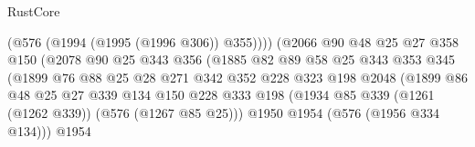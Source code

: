 \begin{lexlean}{RustCore}
\begin{coremodule}
                                        (@576 (@1994 (@1995 (@1996 @306)) @355))))
                                    (@2066
                                      @90
                                      @48
                                      @25
                                      @27
                                      @358
                                      @150
                                      (@2078
                                        @90
                                        @25
                                        @343
                                        @356
                                        (@1885
                                          @82
                                          @89
                                          @58
                                          @25
                                          @343
                                          @353
                                          @345
                                          (@1899
                                            @76
                                            @88
                                            @25
                                            @28
                                            @271
                                            @342
                                            @352
                                            @228
                                            @323
                                            @198
                                            @2048
                                            (@1899
                                              @86
                                              @48
                                              @25
                                              @27
                                              @339
                                              @134
                                              @150
                                              @228
                                              @333
                                              @198
                                              (@1934
                                                @85
                                                @339
                                                (@1261 (@1262 @339))
                                                (@576 (@1267 @85 @25)))
                                              @1950
                                              @1954
                                              (@576 (@1956 @334 @134)))
                                            @1954

\end{coremodule}
\end{lexlean}
